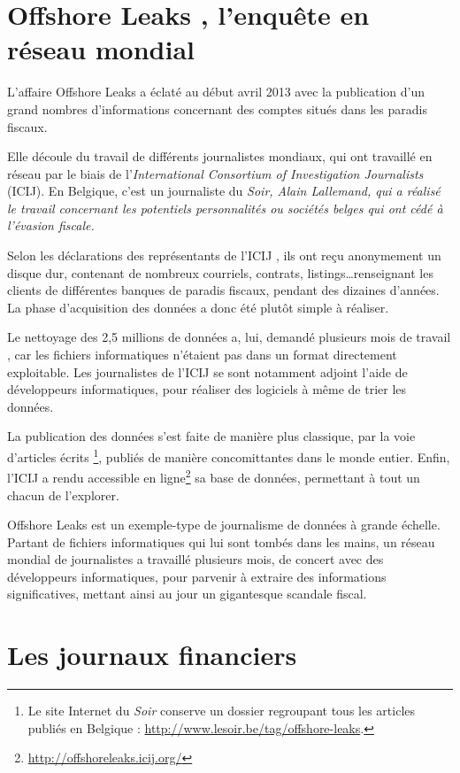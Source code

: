 \section{\og Offshore Leaks \fg, l'enquête en réseau mondial}

L'affaire \og Offshore Leaks \fg a éclaté au début avril 2013 avec la publication d'un grand nombres d'informations concernant des comptes situés dans les paradis fiscaux. 

Elle découle du travail de différents journalistes mondiaux, qui ont travaillé en réseau par le biais de l'\textit{International Consortium of Investigation Journalists} (ICIJ). En Belgique, c'est un journaliste du \em Soir\em, Alain Lallemand, qui a réalisé le travail concernant les potentiels personnalités ou sociétés belges qui ont cédé à l'évasion fiscale.

Selon les déclarations des représentants de l'ICIJ \cite{OL}, ils ont reçu anonymement un disque dur, contenant de nombreux courriels, contrats, listings\dots renseignant les clients de différentes banques de paradis fiscaux, pendant des dizaines d'années. La phase d'acquisition des données a donc été plutôt simple à réaliser.

Le nettoyage des 2,5 millions de données a, lui, demandé plusieurs mois de travail \cite{OL}, car les fichiers informatiques n'étaient pas dans un format directement exploitable. Les journalistes de l'ICIJ se sont notamment adjoint l'aide de développeurs informatiques, pour réaliser des logiciels à même de trier les données.

La publication des données s'est faite de manière plus classique, par la voie d'articles écrits \footnote{Le site Internet du \textit{Soir} conserve un dossier regroupant tous les articles publiés en Belgique : \url{http://www.lesoir.be/tag/offshore-leaks}.}, publiés de manière concomittantes dans le monde entier. Enfin, l'ICIJ a rendu accessible en ligne\footnote{\url{http://offshoreleaks.icij.org/}} sa base de données, permettant à tout un chacun de l'explorer.

\og Offshore Leaks \fg est un exemple-type de journalisme de données à grande échelle. 
Partant de fichiers informatiques qui lui sont tombés dans les mains, un réseau mondial de journalistes a travaillé plusieurs mois, de concert avec des développeurs informatiques, pour parvenir à extraire des informations significatives, mettant ainsi au jour un gigantesque scandale fiscal.

\section{Les journaux financiers}

